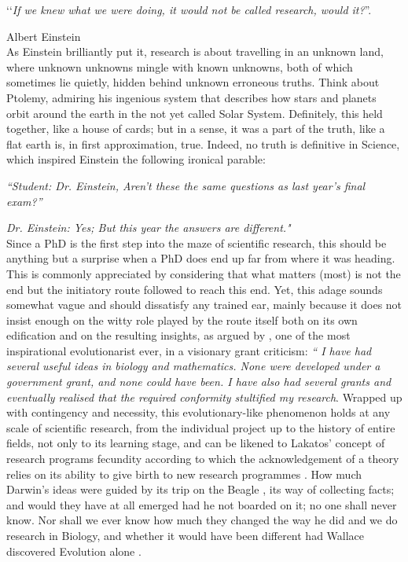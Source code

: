 ‘‘\textit{If we knew what we were doing, it would not be called research, would it?}''.

Albert Einstein\\

As Einstein brilliantly put it, research is about travelling in an unknown land, where unknown unknowns mingle with known unknowns, both of which sometimes lie quietly, hidden behind unknown erroneous truths. Think about Ptolemy, admiring his ingenious system that describes how stars and planets orbit around the earth in the not yet called Solar System. Definitely, this held together, like a house of cards; but in a sense, it was a part of the truth, like a flat earth is, in first approximation, true. Indeed, no truth is definitive in Science, which inspired Einstein the following ironical parable:

\textit{``Student:
Dr. Einstein, Aren't these the same questions as last year's final exam?''}

\textit{Dr. Einstein: Yes; But this year the answers are different."}\\

Since a PhD is the first step into the maze of scientific research, this should be anything but a surprise when a PhD does end up far from where it was heading. This is commonly appreciated by considering that what matters (most) is not the end but the initiatory route followed to reach this end. Yet, this adage sounds somewhat vague and should dissatisfy any trained ear, mainly because it does not insist enough on the witty role played by the route itself both on its own edification and on the resulting insights, as argued by \citet{Van-Valen76}, one of the most inspirational evolutionarist ever, in a visionary grant criticism: \textit{`` I have had several useful ideas in biology and mathematics. None were developed under a government grant, and none could have been. I have also had several grants and eventually realised that the required conformity stultified my research}. Wrapped up with contingency and necessity, this evolutionary-like phenomenon holds at any scale of scientific research, from the individual project up to the history of entire fields, not only to its learning stage, and can be likened to Lakatos' concept of research programs fecundity according to which the acknowledgement of a theory relies on its ability to give birth to new research programmes \citep{Lakatos76,Chalmers76}. How much Darwin's ideas were guided by its trip on the Beagle \citep{Darwin45}, its way of collecting facts; and would they have at all emerged had he not boarded on it; no one shall never know. Nor shall we ever know how much they changed the way he did and we do research in Biology, and whether it would have been different had Wallace discovered Evolution alone \citep{Wallace58}.

